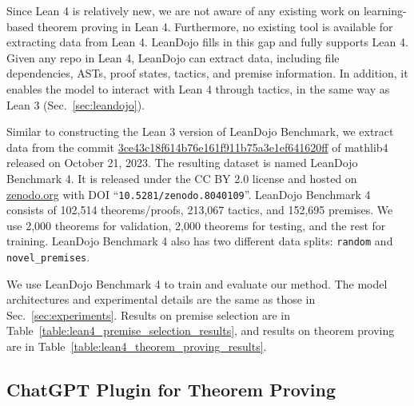 Since Lean 4 is relatively new, we are not aware of any existing work on learning-based theorem proving in Lean 4. Furthermore, no existing tool is available for extracting data from Lean 4. LeanDojo fills in this gap and fully supports Lean 4. Given any repo in Lean 4, LeanDojo can extract data, including file dependencies, ASTs, proof states, tactics, and premise information. In addition, it enables the model to interact with Lean 4 through tactics, in the same way as Lean 3 (Sec.~\ref{sec:leandojo}). 

Similar to constructing the Lean 3 version of LeanDojo Benchmark, we extract data from the commit \href{https://github.com/leanprover-community/mathlib4/commit/3ce43c18f614b76e161f911b75a3e1ef641620ff}{3ce43c18f614b76e161f911b75a3e1ef641620ff} of mathlib4 released on October 21, 2023. The resulting dataset is named LeanDojo Benchmark 4. It is released under the CC BY 2.0 license and hosted on \href{https://zenodo.org/}{zenodo.org} with DOI ``\texttt{10.5281/zenodo.8040109}''. LeanDojo Benchmark 4 consists of 102,514 theorems/proofs, 213,067 tactics, and 152,695 premises. We use 2,000 theorems for validation, 2,000 theorems for testing, and the rest for training. LeanDojo Benchmark 4 also has two different data splits: \texttt{random} and \texttt{novel\_premises}.

We use LeanDojo Benchmark 4 to train and evaluate our method. The model architectures and experimental details are the same as those in Sec.~\ref{sec:experiments}. Results on premise selection are in Table~\ref{table:lean4_premise_selection_results}, and results on theorem proving are in Table~\ref{table:lean4_theorem_proving_results}. 






\subsection{ChatGPT Plugin for Theorem Proving}
\label{appendix:chatgpt}

